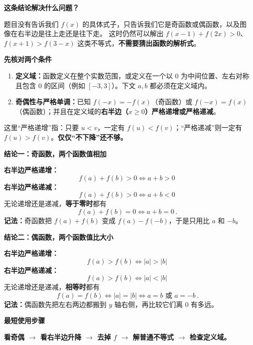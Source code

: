 \begin{statementbox}


\textbf{\textcolor{CStatement}{这条结论解决什么问题？}}

题目没有告诉我们 $f(x)$ 的具体式子，只告诉我们它是奇函数或偶函数，以及图像在右半边是往上走还是往下走。
这时仍然可以解出 $f(x-1)+f(2x)>0$、$f(x+1)>f(3-x)$ 这类不等式，\textbf{不需要猜出函数的解析式}。

\medskip
\textbf{\textcolor{CStatement}{先核对两个条件}}
\begin{enumerate}[leftmargin=*,itemsep=0.35em]
  \item \textbf{定义域：}函数定义在整个实数范围，或定义在一个以 $0$ 为中间位置、左右对称且包含 $0$ 的区间（例如 $[-3,3]$）。下文 $a,b$ 都必须在定义域内。
  \item \textbf{奇偶性与严格单调：}已知 $f(-x)=-f(x)$（奇函数）或 $f(-x)=f(x)$（偶函数）；并且在定义域的\textbf{右半边（$x\geqslant0$）严格递增或严格递减}。
\end{enumerate}
这里“严格递增”指：只要 $u<v$，一定有 $f(u)<f(v)$；“严格递减”则一定有 $f(u)>f(v)$。\textbf{仅仅“不下降”还不够。}

\medskip
\end{statementbox}\clearpage\begin{statementbox}\textbf{\textcolor{CStatement}{结论一：奇函数，两个函数值相加}}

\textbf{右半边严格递增：}
\[
\boxed{\ f(a)+f(b)>0\iff a+b>0\ }
\]
\textbf{右半边严格递减：}
\[
\boxed{\ f(a)+f(b)>0\iff a+b<0\ }
\]
无论递增还是递减，\textbf{等于零时}都有
\[
\boxed{\ f(a)+f(b)=0\iff a+b=0\ }.
\]
\textbf{记法：}奇函数把 $f(a)+f(b)$ 变成 $f(a)-f(-b)$，于是只用比 $a$ 和 $-b$。

\medskip
\end{statementbox}\clearpage\begin{statementbox}\textbf{\textcolor{CStatement}{结论二：偶函数，两个函数值比大小}}



\textbf{右半边严格递增：}
\[
\boxed{\ f(a)>f(b)\iff |a|>|b|\ }
\]
\textbf{右半边严格递减：}
\[
\boxed{\ f(a)>f(b)\iff |a|<|b|\ }
\]
无论递增还是递减，\textbf{相等时}都有
\[
\boxed{\ f(a)=f(b)\iff |a|=|b|\iff a=b\text{ 或 }a=-b\ }.
\]
\textbf{记法：}偶函数先把左右两边都搬到 $y$ 轴右侧，再比较它们离 $0$ 有多远。

\medskip
\textbf{\textcolor{CStatement}{最短使用步骤}}

\textbf{看奇偶 $\longrightarrow$ 看右半边升降 $\longrightarrow$ 去掉 $f$ $\longrightarrow$ 解普通不等式 $\longrightarrow$ 检查定义域。}
\end{statementbox}

